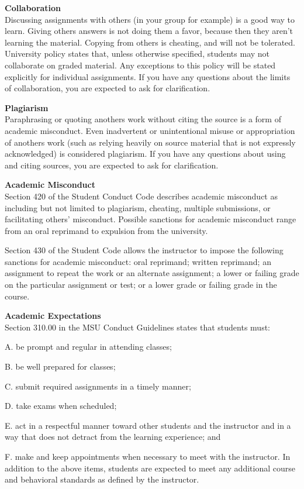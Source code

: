  {\bf Collaboration }\\
Discussing assignments with others (in your group for example) is a
good way to learn.  Giving others answers is not doing them a favor,
because then they aren't learning the material.  Copying from others
is cheating, and will not be tolerated.  
University policy states that, unless otherwise specified, students
may not collaborate on graded material. Any exceptions to this policy
will be stated explicitly for individual assignments. If you have any
questions about the limits of collaboration, you are expected to ask
for clarification. 


 {\bf Plagiarism  }\\
Paraphrasing or quoting anothers work without citing the source is a
form of academic misconduct. Even inadvertent or unintentional misuse
or appropriation of anothers work (such as relying heavily on source
material that is not expressly acknowledged) is considered
plagiarism. If you have any questions about using and citing sources,
you are expected to ask for clarification. 

 {\bf Academic Misconduct  }\\
Section 420 of the Student Conduct Code describes academic misconduct
as including but not limited to plagiarism, cheating, multiple
submissions, or facilitating others’ misconduct. Possible sanctions
for academic misconduct range from an oral reprimand to expulsion from
the university. 

Section 430 of the Student Code allows the instructor to impose the
following sanctions for academic misconduct: oral reprimand; written
reprimand; an assignment to repeat the work or an alternate
assignment; a lower or failing grade on the particular assignment or
test; or a lower grade or failing grade in the course.  

 {\bf Academic Expectations  }\\
Section 310.00 in the MSU Conduct Guidelines states that students
must:\vspace{-.15in}
\begin{list}{}{}
\item[A.] be prompt and regular in attending classes;
\item[B.] be well prepared for classes; 
\item[C.] submit required assignments in a timely manner;
\item[D.] take exams when scheduled;
\item[E.] act in a respectful manner toward other students and the
  instructor and in a way that does not detract from the learning
  experience; and 
\item[F.] make and keep appointments when necessary to meet with the
  instructor.  
In addition to the above items, students are expected to meet any
additional course and behavioral standards as defined by the
instructor. 
\end{list}


